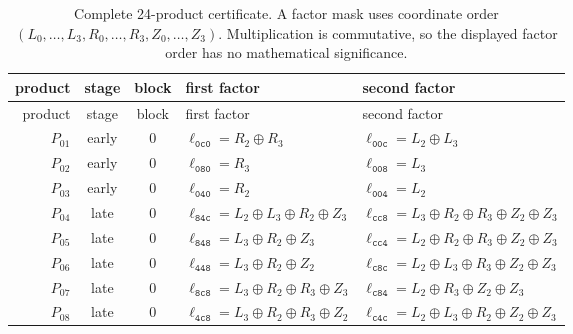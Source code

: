 \begingroup\small
\begin{longtable}{@{}rcc>{\raggedright\arraybackslash}p{}>{\raggedright\arraybackslash}p{}@{}}
\caption{Complete 24-product certificate. A factor mask uses coordinate order $(L_0,\ldots,L_3,R_0,\ldots,R_3,Z_0,\ldots,Z_3)$. Multiplication is commutative, so the displayed factor order has no mathematical significance.}\label{tab:products}\\
\toprule
product & stage & block & first factor & second factor \\
\midrule
\endfirsthead
\toprule
product & stage & block & first factor & second factor \\
\midrule
\endhead
\bottomrule
\endfoot
$P_{01}$ & early & $0$ & $\ell_{\mathtt{0c0}}=R_2\mathbin{\oplus}\allowbreak R_3$ & $\ell_{\mathtt{00c}}=L_2\mathbin{\oplus}\allowbreak L_3$ \\
$P_{02}$ & early & $0$ & $\ell_{\mathtt{080}}=R_3$ & $\ell_{\mathtt{008}}=L_3$ \\
$P_{03}$ & early & $0$ & $\ell_{\mathtt{040}}=R_2$ & $\ell_{\mathtt{004}}=L_2$ \\
$P_{04}$ & late & $0$ & $\ell_{\mathtt{84c}}=L_2\mathbin{\oplus}\allowbreak L_3\mathbin{\oplus}\allowbreak R_2\mathbin{\oplus}\allowbreak Z_3$ & $\ell_{\mathtt{cc8}}=L_3\mathbin{\oplus}\allowbreak R_2\mathbin{\oplus}\allowbreak R_3\mathbin{\oplus}\allowbreak Z_2\mathbin{\oplus}\allowbreak Z_3$ \\
$P_{05}$ & late & $0$ & $\ell_{\mathtt{848}}=L_3\mathbin{\oplus}\allowbreak R_2\mathbin{\oplus}\allowbreak Z_3$ & $\ell_{\mathtt{cc4}}=L_2\mathbin{\oplus}\allowbreak R_2\mathbin{\oplus}\allowbreak R_3\mathbin{\oplus}\allowbreak Z_2\mathbin{\oplus}\allowbreak Z_3$ \\
$P_{06}$ & late & $0$ & $\ell_{\mathtt{448}}=L_3\mathbin{\oplus}\allowbreak R_2\mathbin{\oplus}\allowbreak Z_2$ & $\ell_{\mathtt{c8c}}=L_2\mathbin{\oplus}\allowbreak L_3\mathbin{\oplus}\allowbreak R_3\mathbin{\oplus}\allowbreak Z_2\mathbin{\oplus}\allowbreak Z_3$ \\
$P_{07}$ & late & $0$ & $\ell_{\mathtt{8c8}}=L_3\mathbin{\oplus}\allowbreak R_2\mathbin{\oplus}\allowbreak R_3\mathbin{\oplus}\allowbreak Z_3$ & $\ell_{\mathtt{c84}}=L_2\mathbin{\oplus}\allowbreak R_3\mathbin{\oplus}\allowbreak Z_2\mathbin{\oplus}\allowbreak Z_3$ \\
$P_{08}$ & late & $0$ & $\ell_{\mathtt{4c8}}=L_3\mathbin{\oplus}\allowbreak R_2\mathbin{\oplus}\allowbreak R_3\mathbin{\oplus}\allowbreak Z_2$ & $\ell_{\mathtt{c4c}}=L_2\mathbin{\oplus}\allowbreak L_3\mathbin{\oplus}\allowbreak R_2\mathbin{\oplus}\allowbreak Z_2\mathbin{\oplus}\allowbreak Z_3$ \\

\end{longtable}
